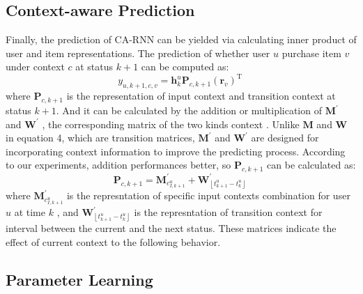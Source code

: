 \documentclass[conference]{IEEEtran}
\begin{document}
\subsection{Context-aware Prediction}

Finally, the prediction of CA-RNN can be yielded via calculating inner product of user and item representations. The prediction of whether user $u$ purchase item $v$  under context $c$ at status $k+1$ can be computed as:
\begin{equation}
y_{u, k+1, c, v} = \mathbf{h}_{k}^{u}\mathbf{P}_{c, k+1}(\mathbf{r}_{v})^ \mathrm{ T }~
\end{equation}
where $\mathbf{P}_{c, k+1}$ is the representation of input context and transition context at status $k+1$. And it can be calculated by the addition or multiplication of $\mathbf{M}^{'}$ and $\mathbf{W}^{'}$ , the corresponding matrix of the two kinds context . Unlike $\mathbf{M}$ and $\mathbf{W}$ in equation 4, which are transition matrices, $\mathbf{M}^{'}$ and $\mathbf{W}^{'}$ are designed for incorporating context information to improve the predicting process. According to our experiments, addition performances better, so $\mathbf{P}_{c, k+1}$ can be calculated as:
\begin{equation}   \label{eqPadd}
\mathbf{P}_{c, k+1}=\mathbf{M}_{c_{I,k+1}^{u}}^{'} + \mathbf{W}_{\left \lfloor t_{k+1}^{u} - t_{k}^{u}\right \rfloor}^{'}~
\end{equation}
where $\mathbf{M}_{c_{I,k+1}^{u}}^{'}$ is the represntation of specific input contexts combination for user $u$ at time $k$ , and $\mathbf{W}_{\left \lfloor t_{k+1}^{u} - t_{k}^{u}\right \rfloor}^{'}$ is the represntation of transition context for interval between the current and the next status. These matrices indicate the effect of current context to the following behavior.




\subsection{Parameter Learning}
\end{document}
